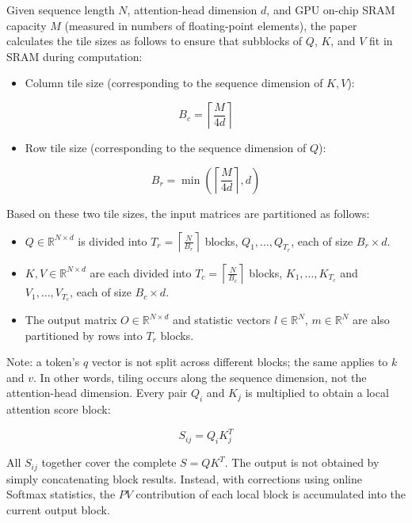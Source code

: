 Given sequence length \(N\), attention-head dimension \(d\), and GPU on-chip SRAM capacity \(M\) (measured in numbers of floating-point elements), the paper calculates the tile sizes as follows to ensure that subblocks of \(Q\), \(K\), and \(V\) fit in SRAM during computation:

\begin{itemize}
\tightlist
\item
{}
  Column tile size (corresponding to the sequence dimension of \(K,V\)):
\end{itemize}

\[
B_c = \left\lceil \frac{M}{4d} \right\rceil
\]

\begin{itemize}
\tightlist
\item
{}
  Row tile size (corresponding to the sequence dimension of \(Q\)):
\end{itemize}

\[
B_r = \min\left(\left\lceil \frac{M}{4d} \right\rceil, d\right)
\]

Based on these two tile sizes, the input matrices are partitioned as follows:

\begin{itemize}
\tightlist
\item
  \(Q \in \mathbb{R}^{N \times d}\) is divided into \(T_r = \left\lceil \frac{N}{B_r} \right\rceil\) blocks, \(Q_1,\ldots,Q_{T_r}\), each of size \(B_r \times d\).
\item
  \(K,V \in \mathbb{R}^{N \times d}\) are each divided into \(T_c = \left\lceil \frac{N}{B_c} \right\rceil\) blocks, \(K_1,\ldots,K_{T_c}\) and \(V_1,\ldots,V_{T_c}\), each of size \(B_c \times d\).
\item
  The output matrix \(O \in \mathbb{R}^{N \times d}\) and statistic vectors \(l \in \mathbb{R}^N\), \(m \in \mathbb{R}^N\) are also partitioned by rows into \(T_r\) blocks.
\end{itemize}

Note: a token's \(q\) vector is not split across different blocks; the same applies to \(k\) and \(v\). In other words, tiling occurs along the sequence dimension, not the attention-head dimension. Every pair \(Q_i\) and \(K_j\) is multiplied to obtain a local attention score block:

\[
S_{ij} = Q_iK_j^T
\]

All \(S_{ij}\) together cover the complete \(S = QK^T\). The output is not obtained by simply concatenating block results. Instead, with corrections using online Softmax statistics, the \(PV\) contribution of each local block is accumulated into the current output block.

